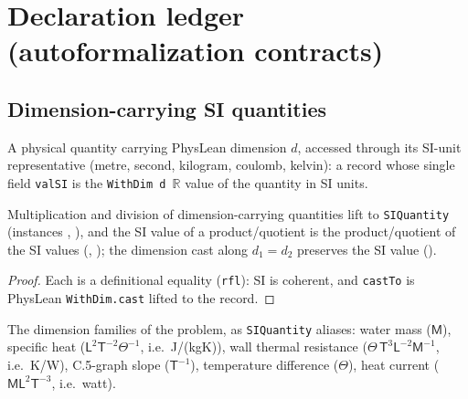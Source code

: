 \section*{Declaration ledger (autoformalization contracts)}

\subsection*{Dimension-carrying SI quantities}

\begin{definition}
\label{def:IPhO2026Problems_problem_IPhO_2026_4_C_6:SIQuantity}
A physical quantity carrying PhysLean dimension $d$, accessed through its
SI-unit representative (metre, second, kilogram, coulomb, kelvin): a record
whose single field \texttt{valSI} is the \texttt{WithDim d $\mathbb{R}$}
value of the quantity in SI units.
\end{definition}

\begin{lemma}
\label{lem:IPhO2026Problems_problem_IPhO_2026_4_C_6:valSI_mul}
Multiplication and division of dimension-carrying quantities lift to
\texttt{SIQuantity} (instances
,
),
and the SI value of a product/quotient is the product/quotient of the SI
values (,
); the dimension cast
 along $d_1 = d_2$ preserves the
SI value ().
\end{lemma}
\begin{proof}
Each is a definitional equality (\texttt{rfl}): SI is coherent, and
\texttt{castTo} is PhysLean \texttt{WithDim.cast} lifted to the record.
\end{proof}

\begin{definition}
\label{def:IPhO2026Problems_problem_IPhO_2026_4_C_6:DimMassQ}
The dimension families of the problem, as \texttt{SIQuantity} aliases:
water mass  ($\mathsf{M}$),
specific heat 
($\mathsf{L}^2\mathsf{T}^{-2}\Theta^{-1}$, i.e.\ J/(kg\cdot K)),
wall thermal resistance 
($\Theta\,\mathsf{T}^3\mathsf{L}^{-2}\mathsf{M}^{-1}$, i.e.\ K/W),
C.5-graph slope  ($\mathsf{T}^{-1}$),
temperature difference  ($\Theta$),
heat current 
($\mathsf{M}\mathsf{L}^2\mathsf{T}^{-3}$, i.e.\ watt).
\end{definition}

